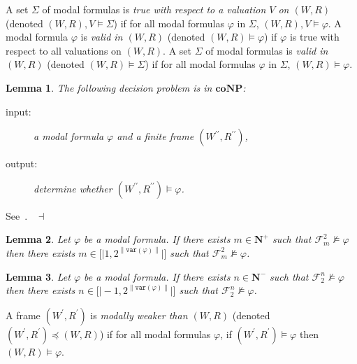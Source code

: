 \documentclass[draft]{article}
\newtheorem{lemma}{Lemma}
\newenvironment{proof}{{\bf Proof:}}{~$\dashv$\\}
\def\lsem{{\lbrack\mid}}
\def\rsem{{\mid\rbrack}}
\def\coNP{\mathbf{coNP}}
\def\vvar{\mathtt{var}}
\begin{document}
A set $\Sigma$ of modal formulas is {\it true with respect to a valuation $V$ on $(W,R)$}\/ (denoted $(W,R),V{\models}\Sigma$) if for all modal formulas $\varphi$ in $\Sigma$, $(W,R),V{\models}\varphi$.
A modal formula $\varphi$ is {\it valid in $(W,R)$}\/ (denoted $(W,R){\models}\varphi$) if $\varphi$ is true with respect to all valuations on $(W,R)$.
A set $\Sigma$ of modal formulas is {\it valid in $(W,R)$}\/ (denoted $(W,R){\models}\Sigma$) if for all modal formulas $\varphi$ in $\Sigma$, $(W,R){\models}\varphi$.
%
%
\begin{lemma}\label{lemma:validity:in:a:given:frame:is:in:coNP}
%
%
The following decision problem is in $\coNP$:
%
%
\begin{description}
%
%
\item[input:] a modal formula $\varphi$ and a finite frame $(W^{\prime\prime},R^{\prime\prime})$,
%
%
\item[output:] determine whether $(W^{\prime\prime},R^{\prime\prime}){\models}\varphi$.
%
%
\end{description}
%
%
\end{lemma}
%
%
\begin{proof}
%
%
See~\cite{Arnold:Crubille:1988,Clarke:et:al:1986}.
%
%
\medskip
%
%
\end{proof}
%
%
\begin{lemma}\label{lemma:about:upper:bound:on:the:kernel:1}
%
%
Let $\varphi$ be a modal formula.
If there exists $m{\in}\mathbf{N}^{+}$ such that ${\mathcal F}_{m}^{2}{\not\models}\varphi$ then there exists $m{\in}\lsem1,2^{{\parallel}\vvar(\varphi){\parallel}}\rsem$ such that ${\mathcal F}_{m}^{2}{\not\models}\varphi$.
%
%
\end{lemma}
%
%
\begin{lemma}\label{lemma:about:upper:bound:on:the:kernel:2}
%
%
Let $\varphi$ be a modal formula.
If there exists $n{\in}\mathbf{N}^{-}$ such that ${\mathcal F}_{2}^{n}{\not\models}\varphi$ then there exists $n{\in}\lsem{-}1,2^{{\parallel}\vvar(\varphi){\parallel}}\rsem$ such that ${\mathcal F}_{2}^{n}{\not\models}\varphi$.
%
%
\end{lemma}
%
%
A frame $(W^{\prime},R^{\prime})$ is {\it modally weaker than $(W,R)$}\/ (denoted $(W^{\prime},R^{\prime}){\preceq}(W,R)$) if for all modal formulas $\varphi$, if $(W^{\prime},R^{\prime}){\models}\varphi$ then $(W,R){\models}\varphi$.
\end{document}
